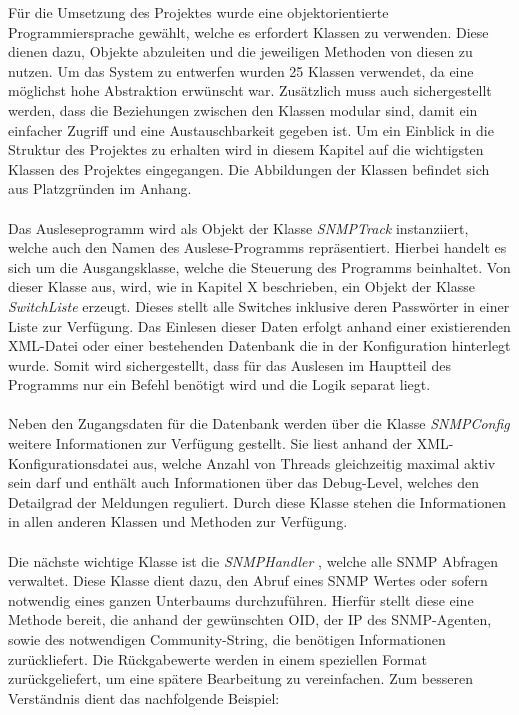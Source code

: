 Für die Umsetzung des Projektes wurde eine objektorientierte Programmiersprache gewählt, welche es erfordert Klassen zu verwenden.
Diese dienen dazu, Objekte abzuleiten und die jeweiligen Methoden von diesen zu nutzen.
Um das System zu entwerfen wurden 25 Klassen verwendet, da eine möglichst hohe Abstraktion erwünscht war.
Zusätzlich muss auch sichergestellt werden, dass die Beziehungen zwischen den Klassen modular sind, damit ein einfacher Zugriff und eine Austauschbarkeit gegeben ist.
Um ein Einblick in die Struktur des Projektes zu erhalten wird in diesem Kapitel auf die wichtigsten Klassen des Projektes eingegangen.
Die Abbildungen der Klassen befindet sich aus Platzgründen im Anhang.\\\\
Das Ausleseprogramm wird als Objekt der Klasse \textit{SNMPTrack} instanziiert, welche auch den Namen des Auslese-Programms repräsentiert.
Hierbei handelt es sich um die Ausgangsklasse, welche die Steuerung des Programms beinhaltet. Von dieser Klasse aus, wird, wie in Kapitel X beschrieben, ein Objekt der Klasse \textit{SwitchListe} erzeugt.
Dieses stellt alle Switches inklusive deren Passwörter in einer Liste zur Verfügung.
Das Einlesen dieser Daten erfolgt anhand einer existierenden XML-Datei oder einer bestehenden Datenbank die in der Konfiguration hinterlegt wurde.
Somit wird sichergestellt, dass für das Auslesen im Hauptteil des Programms nur ein Befehl benötigt wird und die Logik separat liegt.\\\\
Neben den Zugangsdaten für die Datenbank werden über die Klasse \textit{SNMPConfig} weitere Informationen zur Verfügung gestellt.
Sie liest anhand der XML-Konfigurationsdatei aus, welche Anzahl von Threads gleichzeitig maximal aktiv sein darf und enthält auch Informationen über das Debug-Level, welches den Detailgrad der Meldungen reguliert.
Durch diese Klasse stehen die Informationen in allen anderen Klassen und Methoden zur Verfügung.\\\\
Die nächste wichtige Klasse ist die \textit{SNMPHandler} , welche alle SNMP Abfragen verwaltet.
Diese Klasse dient dazu, den Abruf eines SNMP Wertes oder sofern notwendig eines ganzen Unterbaums durchzuführen.
Hierfür stellt diese eine Methode bereit, die anhand der gewünschten OID, der IP des SNMP-Agenten, sowie des notwendigen Community-String, die benötigen Informationen  zurückliefert.
Die Rückgabewerte werden in einem speziellen Format zurückgeliefert, um eine spätere Bearbeitung zu vereinfachen. Zum besseren Verständnis dient das nachfolgende Beispiel:\\

